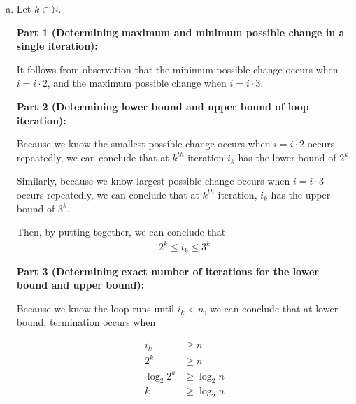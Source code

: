 \documentclass[12pt]{article}
\begin{document}
\begin{enumerate}[a.]
\begin{itemize}


    \end{itemize}


    \item

    Let $k \in \mathbb{N}$.

    \bigskip

    \textbf{Part 1 (Determining maximum and minimum possible change in a single iteration):}

    \bigskip

    It follows from observation that the minimum possible change occurs when
    $i = i \cdot 2$, and the maximum possible change when $i = i \cdot 3$.

    \bigskip

    \textbf{Part 2 (Determining lower bound and upper bound of loop iteration):}

    \bigskip

    Because we know the smallest possible change occurs when $i = i \cdot 2$
    occurs repeatedly, we can conclude that at $k^{th}$ iteration $i_k$ has
    the lower bound of $2^k$.

    \bigskip

    Similarly, because we know largest possible change occurs when $i = i \cdot 3$
    occurs repeatedly, we can conclude that at $k^{th}$ iteration, $i_k$ has
    the upper bound of $3^k$.

    \bigskip

    Then, by putting together, we can conclude that
    \setcounter{equation}{0}
    \begin{align}
        2^k \leq i_k \leq 3^k
    \end{align}

    \bigskip

    \textbf{Part 3 (Determining exact number of iterations for the lower bound and
    upper bound):}

    \bigskip

    Because we know the loop runs until $i_k < n$, we can conclude that
    at lower bound, termination occurs when

    \begin{align}
        i_k &\geq n\\
        2^k &\geq n\\
        \log_2 2^k &\geq \log_2 n\\
        k &\geq \log_2 n
    \end{align}


\end{enumerate}
\end{document}
